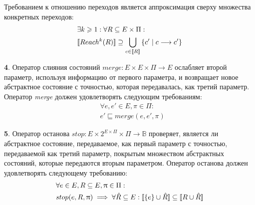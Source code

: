 Требованием к отношению переходов является аппроксимация сверху множества конкретных переходов:
\begin{equation}
\label{cpa_transfer_eq}
\begin{aligned}
& \exists k \geqslant 1: \forall R \subseteq E \times \Pi:\\
& [\![ Reach^k(R) ]\!] \supseteq \bigcup_{c \in [\![ R ]\!]}{\{c' \mid c \longrightarrow c'\}} \\
\end{aligned}
\end{equation}


{\textbf 4.} Оператор слияния состояний $merge: E \times E \times \Pi \rightarrow E$ ослабляет второй параметр, используя информацию от первого параметра, и возвращает новое абстрактное состояние с точностью, которая передавалась, как третий параметр.
Оператор \emph{merge} должен удовлетворять следующим требованиям:
\begin{equation}
\label{cpa_merge_eq}
\begin{aligned}
&\forall e, e' \in E, \pi \in \Pi :\\
&e' \sqsubseteq merge(e, e', \pi)
\end{aligned}
\end{equation}

{\textbf 5.} Оператор останова $stop: E \times 2^{E \times \Pi} \times \Pi \rightarrow \mathbb{B}$ проверяет, является ли абстрактное состояние, передаваемое, как первый параметр с точностью, передаваемой как третий параметр, покрытым множеством абстрактных состояний, которые передаются вторым параметром.
Оператор останова должен удовлетворять следующему требованию:
\begin{equation}
\label{cpa_stop_eq}
\begin{aligned}
&\forall e \in E, R \subseteq E, \uppi \in \Pi:\\
&stop(e, R, \uppi) \implies\forall \hat R \subseteq E: [\![ \{e\}\cup \hat R ]\!] \subseteq [\![ R \cup \hat R ]\!]
\end{aligned}
\end{equation}

